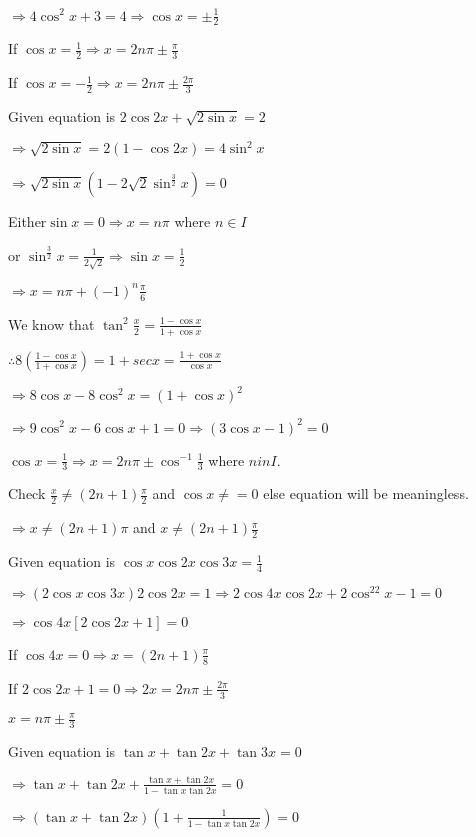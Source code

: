   $\Rightarrow 4\cos^2 x + 3 = 4 \Rightarrow \cos x = \pm \frac{1}{2}$

  If $\cos x = \frac{1}{2}\Rightarrow x = 2n\pi\pm\frac{\pi}{3}$

  If $\cos x = -\frac{1}{2}\Rightarrow x = 2n\pi\pm\frac{2\pi}{3}$
\item Given equation is $2\cos2x + \sqrt{2\sin x} = 2$

  $\Rightarrow \sqrt{2\sin x} = 2(1 - \cos2x) = 4\sin^2x$

  $\Rightarrow \sqrt{2\sin x}\left(1 - 2\sqrt{2}\sin^{\frac{3}{2}}x\right) = 0$

  Either$\sin x = 0 \Rightarrow x = n\pi$ where $n\in I$

  or $\sin^{\frac{3}{2}}x = \frac{1}{2\sqrt{2}} \Rightarrow \sin x = \frac{1}{2}$

  $\Rightarrow x = n\pi + (-1)^n\frac{\pi}{6}$
\item We know that $\tan^2\frac{x}{2} = \frac{1 - \cos x}{1 + \cos x}$

  $\therefore 8\left(\frac{1 - \cos x}{1 + \cos x}\right) = 1 + sec x = \frac{1 + \cos x}{\cos x}$

  $\Rightarrow 8\cos x - 8\cos^2x = (1 + \cos x)^2$

  $\Rightarrow 9\cos^2x - 6\cos x + 1 = 0 \Rightarrow (3\cos x - 1)^2 = 0$

  $\cos x = \frac{1}{3} \Rightarrow x = 2n\pi \pm \cos^{-1}\frac{1}{3}$ where $n in I.$

  Check $\frac{x}{2}\neq (2n + 1)\frac{\pi}{2}$ and $\cos x \neq = 0$ else equation will be meaningless.

  $\Rightarrow x\neq (2n + 1)\pi$ and $x\neq (2n + 1)\frac{\pi}{2}$
\item Given equation is $\cos x\cos2x\cos3x = \frac{1}{4}$

  $\Rightarrow (2\cos x\cos3x)2\cos2x = 1 \Rightarrow 2\cos4x\cos2x + 2\cos^22x - 1 = 0$

  $\Rightarrow \cos4x[2\cos2x + 1] = 0$

  If $\cos4x = 0 \Rightarrow x = (2n + 1)\frac{\pi}{8}$

  If $2\cos2x + 1 = 0 \Rightarrow 2x = 2n\pi \pm \frac{2\pi}{3}$

  $x = n\pi \pm \frac{\pi}{3}$
\item Given equation is $\tan x + \tan2x + \tan3x = 0$

  $\Rightarrow \tan x +\tan2x + \frac{\tan x + \tan 2x}{1 - \tan x\tan 2x} = 0$

  $\Rightarrow (\tan x + \tan 2x)\left(1 + \frac{1}{1 - \tan x\tan 2x}\right) = 0$

